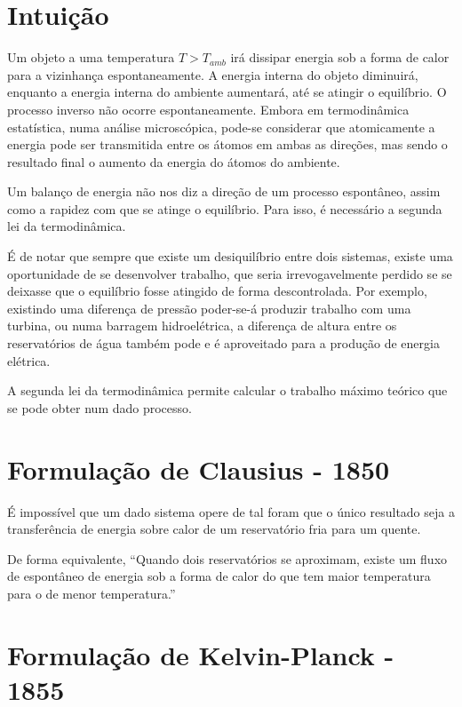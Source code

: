 \section{Intuição}

Um objeto a uma temperatura $T>T_{amb}$ irá dissipar energia sob a forma de calor para a vizinhança espontaneamente. A energia interna do objeto diminuirá, enquanto a energia interna do ambiente aumentará, até se atingir o equilíbrio. O processo inverso não ocorre espontaneamente.
Embora em termodinâmica estatística, numa análise microscópica, pode-se considerar que atomicamente a energia pode ser transmitida entre os átomos em ambas as direções, mas sendo o resultado final o aumento da energia do átomos do ambiente.

Um balanço de energia não nos diz a direção de um processo espontâneo, assim como a rapidez com que se atinge o equilíbrio. Para isso, é necessário a segunda lei da termodinâmica.

É de notar que sempre que existe um desiquilíbrio entre dois sistemas, existe uma oportunidade de se desenvolver trabalho, que seria irrevogavelmente perdido se se deixasse que o equilíbrio fosse atingido de forma descontrolada. Por exemplo, existindo uma diferença de pressão poder-se-á produzir trabalho com uma turbina, ou numa barragem hidroelétrica, a diferença de altura entre os reservatórios de água também pode e é aproveitado para a produção de energia elétrica.


A segunda lei da termodinâmica permite calcular o trabalho máximo teórico que se pode obter num dado processo.


\section{Formulação de Clausius - 1850}

\begin{theorem}[Clausius]
    É impossível que um dado sistema opere de tal foram que o único resultado seja a transferência de energia sobre calor de um reservatório fria para um quente.
\end{theorem}


De forma equivalente, ``Quando dois reservatórios se aproximam, existe um fluxo de espontâneo de energia sob a forma de calor do que tem maior temperatura para o de menor temperatura.''


\section{Formulação de Kelvin-Planck - 1855}

